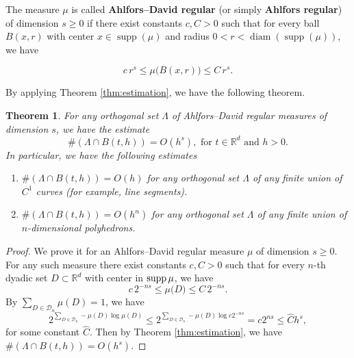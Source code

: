 \documentclass[12pt,a4paper,intlimits,sumlimits]{amsart}
\theoremstyle{plain}
\newtheorem{theorem}{Theorem}
\theoremstyle{definition}
\newcommand{\RR}{{\mathbb R}}
\newcommand{\supp}{{\rm supp\,}}
\newcounter{rem}
\begin{document}
The measure $\mu$ is called \textbf{Ahlfors--David regular} (or simply \textbf{Ahlfors regular}) 
of dimension $s \geq 0$ if there exist constants $c, C > 0$ such that for every ball 
$B(x,r)$ with center $x \in \operatorname{supp}(\mu)$ and radius 
$0 < r < \operatorname{diam}(\operatorname{supp}(\mu))$, we have

\[
c\, r^s \leq \mu\bigl(B(x,r)\bigr) \leq C\, r^s .
\]

By applying Theorem \ref{thm:estimation}, we have the following theorem.
 
\begin{theorem}
For any orthogonal set $\Lambda$ of Ahlfors--David regular measures of dimension $s$, we have the estimate
$$\# (\Lambda\cap B(t, h)) = O(h^s), \text{ for } t\in \RR^d \text{ and } h>0. $$ 
In particular, we have the following estimates 
    \begin{enumerate}
        \item $\#(\Lambda\cap B(t, h)) = O(h)$ for any orthogonal set $\Lambda$ of any finite union of $C^1$ curves (for example, line segments).
        \item $\# (\Lambda\cap B(t, h)) = O(h^n)$ for any orthogonal set $\Lambda$ of any finite union of $n$-dimensional polyhedrons.
    \end{enumerate}
\end{theorem}
\begin{proof}
    We prove it for an Ahlfors--David regular measure $\mu$ of dimension $s\ge 0$. For any such measure there exist constants $c, C > 0$ such that for every $n$-th dyadic set
$D \subset \RR^d$ with center in $\supp \mu$, we have
\[
c\, 2^{-ns} \leq \mu\bigl(D\bigr) \leq C\, 2^{-ns} .
\]
By $\sum_{D\in \mathcal{D}_{n}}\mu(D)=1$, we have
$$
2^{\sum_{D\in \mathcal{D}_n} -\mu(D)\log \mu(D)} \le 2^{\sum_{D\in \mathcal{D}_n} -\mu(D)\log c2^{-ns}}=c2^{ns}\le \hat{C} h^s,
$$
for some constant $\hat{C}$. Then by Theorem \ref{thm:estimation}, we have 
$\# (\Lambda\cap B(t, h))=O(h^s)$.

\end{proof}
\end{document}
